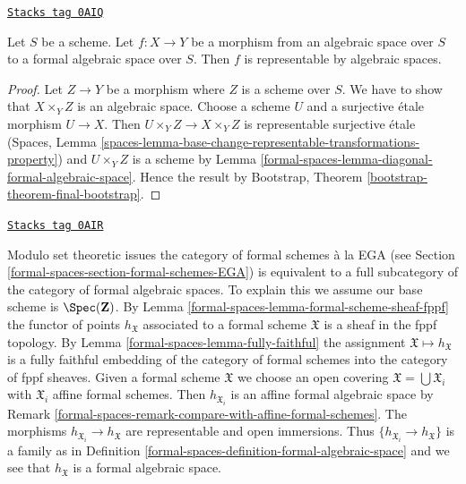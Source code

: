\begin{lemma}
\label{formal-spaces-lemma-space-to-formal-space}
\href{https://stacks.math.columbia.edu/tag/0AIQ}{\texttt{Stacks tag 0AIQ}}

Let $S$ be a scheme. Let $f : X \to Y$ be a morphism from an
algebraic space over $S$ to a formal algebraic space over $S$.
Then $f$ is representable by algebraic spaces.
\end{lemma}

\begin{proof}
Let $Z \to Y$ be a morphism where $Z$ is a scheme over $S$.
We have to show that $X \times_Y Z$ is an algebraic space.
Choose a scheme $U$ and a surjective \'etale morphism $U \to X$.
Then $U \times_Y Z \to X \times_Y Z$ is representable surjective \'etale
(Spaces, Lemma
\ref{spaces-lemma-base-change-representable-transformations-property})
and $U \times_Y Z$ is a scheme by
Lemma \ref{formal-spaces-lemma-diagonal-formal-algebraic-space}.
Hence the result by
Bootstrap, Theorem \ref{bootstrap-theorem-final-bootstrap}.
\end{proof}

\begin{remark}
\label{formal-spaces-remark-compare-with-formal-schemes}
\href{https://stacks.math.columbia.edu/tag/0AIR}{\texttt{Stacks tag 0AIR}}

Modulo set theoretic issues the category of formal schemes \`a la EGA
(see Section \ref{formal-spaces-section-formal-schemes-EGA}) is equivalent to a full
subcategory of the category of formal algebraic spaces. To explain this
we assume our base scheme is $\Spec(\mathbf{Z})$. By
Lemma \ref{formal-spaces-lemma-formal-scheme-sheaf-fppf} the functor of points
$h_\mathfrak X$ associated to a formal scheme $\mathfrak X$ is a sheaf
in the fppf topology. By Lemma \ref{formal-spaces-lemma-fully-faithful}
the assignment $\mathfrak X \mapsto h_\mathfrak X$ is a fully faithful
embedding of the category of formal schemes into the category of
fppf sheaves. Given a formal scheme $\mathfrak X$ we choose an open covering
$\mathfrak X = \bigcup \mathfrak X_i$ with $\mathfrak X_i$
affine formal schemes. Then $h_{\mathfrak X_i}$
is an affine formal algebraic space by
Remark \ref{formal-spaces-remark-compare-with-affine-formal-schemes}.
The morphisms $h_{\mathfrak X_i} \to h_\mathfrak X$ are representable
and open immersions. Thus $\{h_{\mathfrak X_i} \to h_\mathfrak X\}$
is a family as in Definition \ref{formal-spaces-definition-formal-algebraic-space}
and we see that $h_\mathfrak X$ is a formal algebraic space.
\end{remark}

